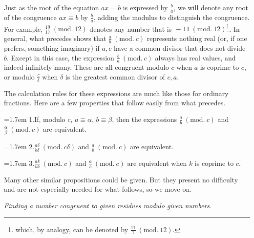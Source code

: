 Just as the root of the equation $ax=b$ is expressed by $\frac{b}{a}$, we will denote any root of the congruence $ax\equiv b$ by $\frac{b}{a}$, adding the modulus to distinguish the congruence. For example, $\frac{19}{17}\ (\mathrm{mod.}\ 12)$ denotes any number that is $\equiv 11\ (\mathrm{mod.}\ 12)$\begingroup\renewcommand{\thefootnote}{*)}\footnote{which, by analogy, can be denoted by $\frac{11}{1}\ (\mathrm{mod.}\ 12)$.}\endgroup. In general, what precedes shows that $\frac{a}{b}\ (\mathrm{mod.}\ c)$ represents nothing real (or, if one prefers, something imaginary) if $a,c$ have a common divisor that does not divide $b$. Except in this case, the expression $\frac{b}{a}\ (\mathrm{mod.}\ c)$ always has real values, and indeed infinitely many. These are all congruent modulo $c$ when $a$ is coprime to $c$, or modulo $\frac{c}{\delta}$ when $\delta$ is the greatest common divisor of $c,a$.

The calculation rules for these expressions are much like those for ordinary fractions. Here are a few properties that follow easily from what precedes.

\hangindent=1.7em
1.\quad If, modulo $c$, $a\equiv\alpha$, $b\equiv\beta$, then the expressions $\frac{a}{b}\ (\mathrm{mod.}\ c)$ and $\frac{\alpha}{\beta}\ (\mathrm{mod.}\ c)$ are equivalent.

\hangindent=1.7em
2.\quad $\frac{a\delta}{b\delta}\ (\mathrm{mod.}\ c\delta)$ and $\frac{a}{b}\ (\mathrm{mod.}\ c)$ are equivalent.

\hangindent=1.7em
3.\quad $\frac{ak}{bk}\ (\mathrm{mod.}\ c)$ and $\frac{a}{b}\ (\mathrm{mod.}\ c)$ are equivalent when $k$ is coprime to $c$.

Many other similar propositions could be given. But they present no difficulty and are not especially needed for what follows, so we move on.

\begin{center}\small\emph{Finding a number congruent to given residues modulo given numbers.}\end{center}


